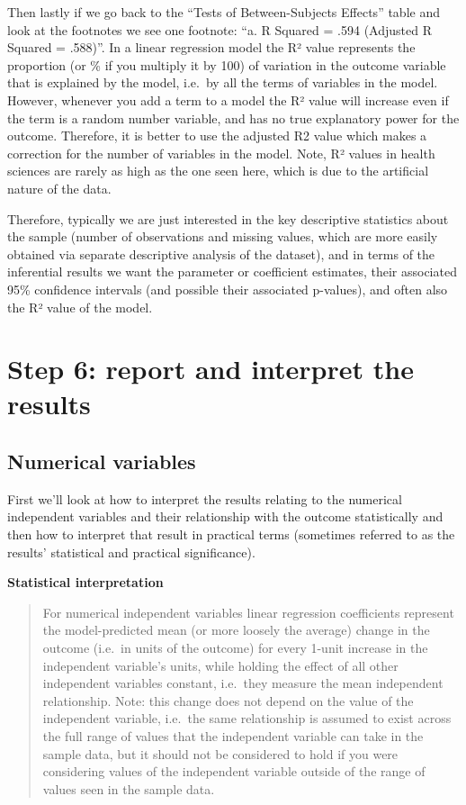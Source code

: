 \documentclass[
]{book}
\begin{document}
Then lastly if we go back to the ``Tests of Between-Subjects Effects'' table and look at the footnotes we see one footnote: ``a. R Squared = .594 (Adjusted R Squared = .588)''. In a linear regression model the R² value represents the proportion (or \% if you multiply it by 100) of variation in the outcome variable that is explained by the model, i.e.~by all the terms of variables in the model. However, whenever you add a term to a model the R² value will increase even if the term is a random number variable, and has no true explanatory power for the outcome. Therefore, it is better to use the adjusted R2 value which makes a correction for the number of variables in the model. Note, R² values in health sciences are rarely as high as the one seen here, which is due to the artificial nature of the data.

Therefore, typically we are just interested in the key descriptive statistics about the sample (number of observations and missing values, which are more easily obtained via separate descriptive analysis of the dataset), and in terms of the inferential results we want the parameter or coefficient estimates, their associated 95\% confidence intervals (and possible their associated p-values), and often also the R² value of the model.

\hypertarget{step-6-report-and-interpret-the-results}{%
\section{Step 6: report and interpret the results}\label{step-6-report-and-interpret-the-results}}

\hypertarget{numerical-variables-1}{%
\subsection{Numerical variables}\label{numerical-variables-1}}

First we'll look at how to interpret the results relating to the numerical independent variables and their relationship with the outcome statistically and then how to interpret that result in practical terms (sometimes referred to as the results' statistical and practical significance).

\textbf{Statistical interpretation}

\begin{quote}
For numerical independent variables linear regression coefficients represent the model-predicted mean (or more loosely the average) change in the outcome (i.e.~in units of the outcome) for every 1-unit increase in the independent variable's units, while holding the effect of all other independent variables constant, i.e.~they measure the mean independent relationship. Note: this change does not depend on the value of the independent variable, i.e.~the same relationship is assumed to exist across the full range of values that the independent variable can take in the sample data, but it should not be considered to hold if you were considering values of the independent variable outside of the range of values seen in the sample data.
\end{quote}
\end{document}
